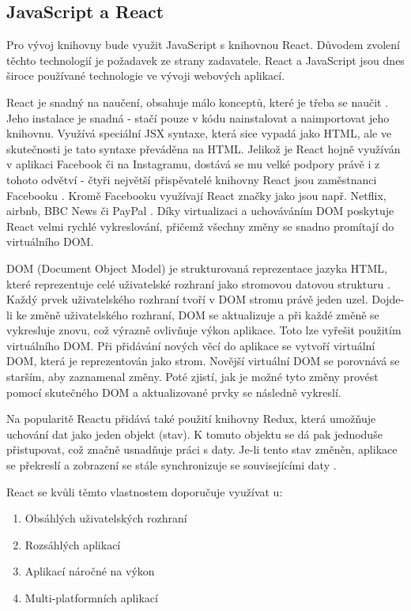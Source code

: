 \documentclass[czech, bc, kiv, he, iso690numb]{fasthesis}
\begin{document}
\subsection{JavaScript a React}
Pro vývoj knihovny bude využit JavaScript s knihovnou React. Důvodem zvolení těchto technologií je požadavek ze strany zadavatele. React a JavaScript jsou dnes
široce používané technologie ve vývoji webových aplikací. 

React je snadný na naučení, obsahuje málo konceptů, které je třeba se naučit \cite{whyUsingReact}. Jeho instalace je snadná -
stačí pouze v kódu nainstalovat a naimportovat jeho knihovnu. Využívá speciální JSX syntaxe, která sice vypadá jako HTML, ale ve skutečnosti je tato syntaxe převáděna na HTML. Jelikož je React hojně využíván
v aplikaci Facebook či na Instagramu, dostává se mu velké podpory právě i z tohoto odvětví - čtyři největší přispěvatelé knihovny React jsou zaměstnanci Facebooku \cite{whyUsingReact}. Kromě 
Facebooku využívají React značky jako jsou např. Netflix, airbnb, BBC News či PayPal \cite{whyUsingReact2}. Díky virtualizaci a uchováváním DOM poskytuje React
velmi rychlé vykreslování, přičemž všechny změny se snadno promítají do virtuálního DOM.

DOM (Document Object Model) je strukturovaná reprezentace jazyka HTML, které reprezentuje celé uživatelské rozhraní jako stromovou datovou strukturu \cite{whatIsDOM}. Každý prvek uživatelského
rozhraní tvoří v DOM stromu právě jeden uzel. Dojde-li ke změně uživatelského rozhraní, DOM se aktualizuje 	a při každé změně se vykresluje znovu, což výrazně ovlivňuje výkon aplikace. 
Toto lze vyřešit použitím virtuálního DOM. Při přidávání nových věcí do aplikace se vytvoří virtuální DOM, která je reprezentován jako strom. Novější virtuální DOM se porovnává se starším, aby
zaznamenal změny. Poté zjistí, jak je možné tyto změny provést pomocí skutečného DOM a aktualizované prvky se následně vykreslí.

Na popularitě Reactu přidává také použití knihovny Redux, která umožňuje uchování dat jako jeden objekt (stav). K tomuto objektu se dá pak jednoduše přistupovat, což značně usnadňuje práci s daty.
Je-li tento stav změněn, aplikace se překreslí a zobrazení se stále synchronizuje se souvisejícími daty \cite{whyUsingReact2}. 

React se kvůli těmto vlastnostem doporučuje využívat u:
\begin{enumerate}
\item Obsáhlých uživatelských rozhraní
\item Rozsáhlých aplikací
\item Aplikací náročné na výkon
\item Multi-platformních aplikací
\end{enumerate}
\end{document}
